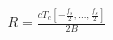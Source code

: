 \documentclass[preview]{standalone}
\begin{document}
\begin{align*}
R = \frac{c T_{c} \left[ -\frac{f_s}{2}, \dotsc , \frac{f_s}{2} \right] }{2 B}
\end{align*}
\end{document}
